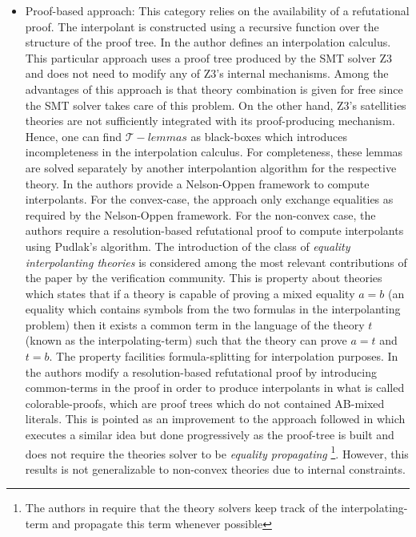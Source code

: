 \begin{itemize}
  \item Proof-based approach: This category relies on the availability
    of a refutational proof.  The interpolant is constructed using a
    recursive function over the structure of the proof
    tree. In \cite{10.1007/978-3-540-24730-2_2,mcmillan2011interpolants}
    the author defines an interpolation calculus. This particular
    approach uses a proof tree produced by the SMT solver Z3 
    and does not need to modify any of Z3's internal mechanisms.
    Among the advantages of this approach is that
    theory combination is given for free since the SMT solver takes care of this
    problem. On the other hand, Z3's
    satellities theories are not sufficiently integrated with its
    proof-producing mechanism. Hence, one can find $\mathcal{T}-lemmas$
    as black-boxes which introduces incompleteness in the
    interpolation calculus. For completeness, these lemmas are 
    solved separately by another interpolantion algorithm for the respective
    theory. 
    In \cite{10.1007/11532231_26} the authors provide a Nelson-Oppen framework
    to compute interpolants. For the convex-case, the approach only 
    exchange equalities as required by the Nelson-Oppen framework. For
    the non-convex case, the authors require a resolution-based refutational proof
    to compute interpolants using Pudlak's algorithm. The introduction of the
    class of \emph{equality interpolanting theories} is 
    considered among the most relevant contributions of the paper 
    by the verification community. This is property about theories which states
    that if a theory is capable of proving a mixed equality $a = b$ (an equality
    which contains symbols from the two formulas in the interpolanting problem)
    then it exists a common term in the language of the theory $t$ (known as
    the interpolating-term) such that 
    the theory can prove $a = t$ and $t = b$. The property facilities 
    formula-splitting for interpolation purposes.
    In \cite{10.1007/978-3-642-00768-2_34} the authors modify a 
    resolution-based refutational proof by introducing common-terms in 
    the proof in order to produce interpolants in what is called
    colorable-proofs, which are proof trees which do not contained AB-mixed
    literals. This is pointed as an improvement to the approach followed 
    in \cite{10.1007/11532231_26} which executes a similar idea but done 
    progressively as the proof-tree is built and does not require 
    the theories solver to be \emph{equality propagating} 
    \footnote{The authors in \cite{10.1007/11532231_26} require that 
      the theory solvers keep track of the interpolating-term 
      and propagate this term whenever
    possible}. 
    However, this results is not generalizable
    to non-convex theories due to internal constraints.


\end{itemize}
